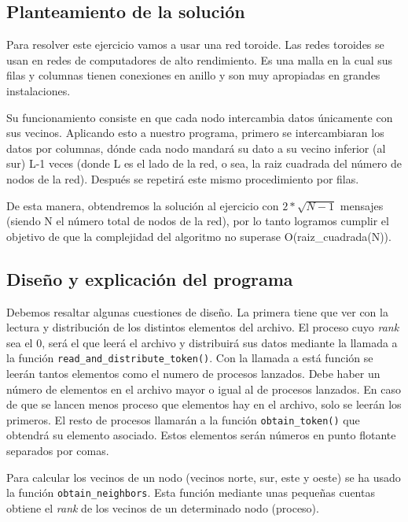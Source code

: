 \documentclass[11pt]{article}
\begin{document}
\subsection{Planteamiento de la solución}
Para resolver este ejercicio vamos a usar una red toroide. Las redes toroides se usan en redes de computadores de alto rendimiento. Es una malla en la cual sus filas y columnas tienen conexiones en anillo y son muy apropiadas en grandes instalaciones. 

Su funcionamiento consiste en que cada nodo intercambia datos únicamente con sus vecinos. Aplicando esto a nuestro programa, primero se intercambiaran los datos por columnas, dónde cada nodo mandará su dato a su vecino inferior (al sur) L-1 veces (donde L es el lado de la red, o sea, la raiz cuadrada del número de nodos de la red). Después se repetirá este mismo procedimiento por filas.

De esta manera, obtendremos la solución al ejercicio con $2*\sqrt{N-1}$ mensajes (siendo N el número total de nodos de la red), por lo tanto logramos cumplir el objetivo de que la complejidad del algoritmo no superase O(raiz\_cuadrada(N)).


\subsection{Diseño y explicación del programa}
Debemos resaltar algunas cuestiones de diseño. La primera tiene que ver con la lectura y distribución de los distintos elementos del archivo. El proceso cuyo \emph{rank} sea el 0, será el que leerá el archivo y distribuirá sus datos mediante la llamada a la función \texttt{read\_and\_distribute\_token()}. Con la llamada a está función se leerán tantos elementos como el numero de procesos lanzados. Debe haber un número de elementos en el archivo mayor o igual al de procesos lanzados. En caso de que se lancen menos proceso que elementos hay en el archivo, solo se leerán los primeros. El resto de procesos llamarán a la función \texttt{obtain\_token()} que obtendrá su elemento asociado. Estos elementos serán números en punto flotante separados por comas.

Para calcular los vecinos de un nodo (vecinos norte, sur, este y oeste) se ha usado la función \texttt{obtain\_neighbors}. Esta función mediante unas pequeñas cuentas obtiene el \emph{rank} de los vecinos de un determinado nodo (proceso).
\end{document}
